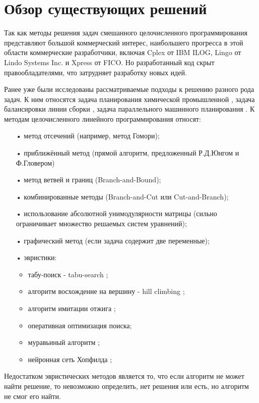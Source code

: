 \documentclass[a4paper,14pt,russian]{extreport}
\begin{document}
\section{Обзор существующих решений}
Так как методы решения задач смешанного целочисленного программирования представляют большой коммерческий интерес, наибольшего прогресса в этой области коммерческие разработчики, включая Cplex от IBM ILOG, Lingo от Lindo Systems Inc. и Xpress от FICO. Но разработанный код скрыт правообладателями, что затрудняет разработку новых идей. 
\par
Ранее уже были исследованы рассматриваемые подходы к решению разного рода задач. К ним относятся задача планирования химической промышленной \cite{timpe}, задача балансировки линии сборки \cite{bockmayr_pisaruk}, задача параллельного машинного планирования \cite{jain_grossmann}.
К методам целочисленного линейного программирования относят:
\begin{itemize}
\item[•] метод отсечений (например, метод Гомори);
\item[•] приближённый метод (прямой алгоритм, предложенный Р.Д.Юнгом и Ф.Гловером)
\item[•] метод ветвей и границ (Branch-and-Bound);
\item[•] комбинированные методы (Branch-and-Cut или Cut-and-Branch);
\item[•] использование абсолютной унимодулярности матрицы (сильно ограничивает множество решаемых систем уравнений);
\item[•] графический метод (если задача содержит две переменные);
\item[•] эвристики:
\begin{itemize}
\item табу-поиск - tabu-search \cite{glover};
\item алгоритм восхождение на вершину - hill climbing \cite{russell};
\item алгоритм имитации отжига \cite{kirkpatrick};
\item оперативная оптимизация поиска;
\item муравьиный алгоритм \cite{colorni};
\item нейронная сеть Хопфилда \cite{lau};
\end{itemize}
\end{itemize}
\par
Недостатком эвристических методов является то, что если алгоритм не может найти решение, то невозможно определить, нет решения или есть, но алгоритм не смог его найти. 
\par
\end{document}
